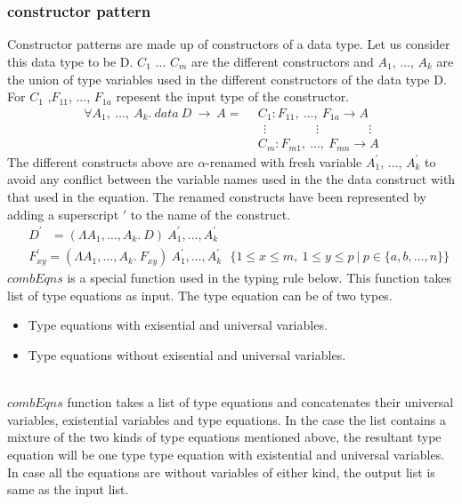 \documentclass[11pt]{article}
\begin{document}
~~\\~~\\
\subsubsection {constructor pattern}
Constructor patterns are made up of constructors of a data type. Let us consider this data type to be D. $C_1$ $\ldots$ $C_m$ are the different constructors and $A_1$, $\ldots$, $A_k$ are the union of type variables used in the different constructors of the data type D. For $C_1$ ,$F_{11}$, $\ldots$, $F_{1a}$ repesent the input type of the constructor.
\begin{align*} 
\forall A_1,~ \ldots,~A_k.~data~ D ~\to~ A =
 & ~~ C_1 : F_{11},~ \ldots, ~ F_{1a} \to A \\
 & ~~~~ \vdots \qquad\qquad \vdots \qquad\qquad \vdots \\ 
 & ~~ C_m : F_{m1} ,~ \ldots, ~ F_{mn} \to A
\end{align*}
The different constructs above are $\alpha$-renamed with fresh variable $A_1^{\prime}$, $\ldots$, $A_k^{\prime}$ to avoid any conflict between the variable names used in the the data construct with that used in the equation. The renamed constructs have been represented by adding a superscript $\prime$ to the name of the construct.
\begin{align*}
 & ~~ D^\prime ~~~ = (\Lambda A_1,\ldots,A_k.~ D)~A_1^{\prime},\ldots,A_k^{\prime}\\ 
 & ~~ F_{xy}^\prime = (\Lambda A_1,\ldots,A_k.~F_{xy})~A_1^{\prime},\ldots,A_k^{\prime} 
 ~~~  \{1 \leq x \leq m,~1 \leq y \leq p ~|~ p \in \{a,b,\ldots,n\} \} 
 \end{align*}
$combEqns$ is a special function used in the typing rule below. This function takes list of type equations as input. The type equation can be of two types.
\begin {itemize}
  \item Type equations with exisential and universal variables.
  \item Type equations without exisential and universal variables.
\end {itemize}
~~\\ 
$combEqns$ function takes a list of type equations and concatenates their universal variables, existential variables and type equations. In the case the list contains a mixture of the two kinds of type equations mentioned above, the resultant type equation will be one type type equation with existential and universal variables. In case all the equations are without variables of either kind, the output list is same as the input list.
\end{document}
